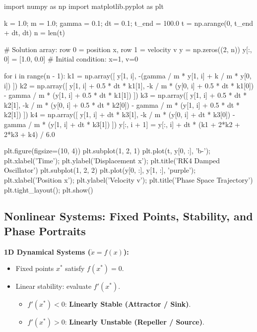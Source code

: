 \documentclass{article}
\begin{document}
\begin{jupytercode}
import numpy as np
import matplotlib.pyplot as plt

k = 1.0; m = 1.0; gamma = 0.1; dt = 0.1; t_end = 100.0
t = np.arange(0, t_end + dt, dt)
n = len(t)

# Solution array: row 0 = position x, row 1 = velocity v
y = np.zeros((2, n))
y[:, 0] = [1.0, 0.0] # Initial condition: x=1, v=0

for i in range(n - 1):
    k1 = np.array([
        y[1, i],
        -(gamma / m * y[1, i] + k / m * y[0, i])
    ])
    k2 = np.array([
        y[1, i] + 0.5 * dt * k1[1],
        -k / m * (y[0, i] + 0.5 * dt * k1[0]) - gamma / m * (y[1, i] + 0.5 * dt * k1[1])
    ])
    k3 = np.array([
        y[1, i] + 0.5 * dt * k2[1],
        -k / m * (y[0, i] + 0.5 * dt * k2[0]) - gamma / m * (y[1, i] + 0.5 * dt * k2[1])
    ])
    k4 = np.array([
        y[1, i] + dt * k3[1],
        -k / m * (y[0, i] + dt * k3[0]) - gamma / m * (y[1, i] + dt * k3[1])
    ])
    y[:, i + 1] = y[:, i] + dt * (k1 + 2*k2 + 2*k3 + k4) / 6.0

plt.figure(figsize=(10, 4))
plt.subplot(1, 2, 1)
plt.plot(t, y[0, :], 'b-'); plt.xlabel('Time'); plt.ylabel('Displacement x'); plt.title('RK4 Damped Oscillator')
plt.subplot(1, 2, 2)
plt.plot(y[0, :], y[1, :], 'purple'); plt.xlabel('Position x'); plt.ylabel('Velocity v'); plt.title('Phase Space Trajectory')
plt.tight_layout(); plt.show()
\end{jupytercode}
\newpage

\subsection{Nonlinear Systems: Fixed Points, Stability, and Phase Portraits}
\textbf{1D Dynamical Systems ($\dot{x} = f(x)$):}
\begin{itemize}
    \item Fixed points $x^*$ satisfy $f(x^*) = 0$.
    \item Linear stability: evaluate $f'(x^*)$.
    \begin{itemize}
        \item $f'(x^*) < 0$: \textbf{Linearly Stable (Attractor / Sink)}.
        \item $f'(x^*) > 0$: \textbf{Linearly Unstable (Repeller / Source)}.
    \end{itemize}
\end{itemize}
\end{document}
